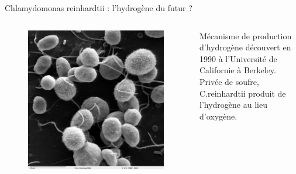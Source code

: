 \documentclass{beamer}
\begin{document}
\begin{frame}{Chlamydomonas reinhardtii : l'hydrogène du futur ?}
	\begin{columns}
		\begin{column}{0.40\textwidth}
		\begin{figure}
		\includegraphics[scale=0.14]{schema/Chlamydomonas.jpg}
		\end{figure}
		
		\end{column}
		\begin{column}{0.40\textwidth}
		Mécanisme de production d'hydrogène découvert en 1990 à l'Université de Californie à Berkeley.\\[1em]
		
		Privée de soufre, C.\;reinhardtii produit de l'hydrogène au lieu d'oxygène.
		\end{column}
	\end{columns}
\end{frame}
\end{document}
